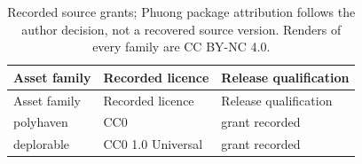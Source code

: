 \begingroup\small
\setlength{\tabcolsep}{4pt}
\begin{longtable}{l>{\raggedright\arraybackslash}p{.40\linewidth}l}
\caption{Recorded source grants; Phuong package attribution follows the author decision, not a recovered source version. Renders of every family are CC BY-NC 4.0.}\label{tab:licences}\\
\toprule
Asset family & %
Recorded licence & %
Release qualification \\ %
\midrule

\endfirsthead
\toprule
Asset family & %
Recorded licence & %
Release qualification \\ %
\midrule

\endhead
\bottomrule\endfoot
polyhaven & %
CC0 & %
grant recorded \\ %

deplorable & %
CC0 1.0 Universal & %
grant recorded \\ %


\end{longtable}
